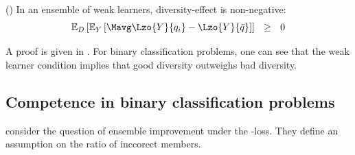 \documentclass[../main.tex]{subfiles}
\begin{document}
\begin{theorem} 
    \label{thm:weak-learner-ensembles-nonnegative}
    (\cite{wood_UnifiedTheoryDiversity_2023}) In an ensemble of weak learners, diversity-effect is non-negative:
$$
\mathbb{E}_{D}\left[ 
\mathbb{E}_{Y}\left[ 
\Mavg \Lzo{Y}{q_{i}} - \Lzo{Y}{\bar{q}}
\right] 
\right] 
~ ~ \geq ~ ~ 0
$$
\end{theorem}

A proof is given in \cite{wood_UnifiedTheoryDiversity_2023}. For binary classification problems, one can see that the weak learner condition implies that good diversity outweighs bad diversity.

\subsection{Competence in binary classification problems}

\citeauthor{theisen_WhenAreEnsembles_2023} consider the question of ensemble improvement under the \zeroone-loss. They define an assumption on the ratio of inccorect members.
\end{document}

